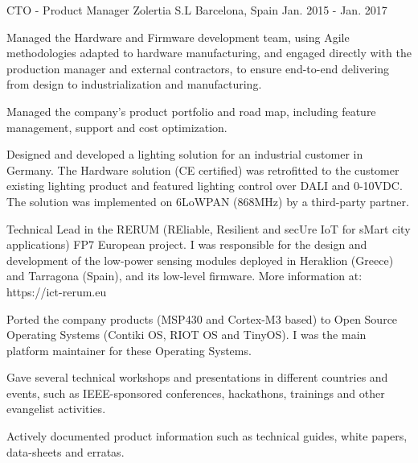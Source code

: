 \begin{cventries}

  \cventry
    {CTO - Product Manager} %
    {Zolertia S.L} %
    {Barcelona, Spain} %
    {Jan. 2015 - Jan. 2017} %
    {
      \begin{cvitems} %
        \item {Managed the Hardware and Firmware development team, using Agile methodologies adapted to hardware manufacturing, and engaged directly with the production manager and external contractors, to ensure end-to-end delivering from design to industrialization and manufacturing.}
        \item {Managed the company's product portfolio and road map, including feature management, support and cost optimization.}
        \item {Designed and developed a lighting solution for an industrial customer in Germany.  The Hardware solution (CE certified) was retrofitted to the customer existing lighting product and featured lighting control over DALI and 0-10VDC.  The solution was implemented on 6LoWPAN (868MHz) by a third-party partner.}
        \item {Technical Lead in the RERUM (REliable, Resilient and secUre IoT for sMart city applications) FP7 European project.  I was responsible for the design and development of the low-power sensing modules deployed in Heraklion (Greece) and Tarragona (Spain), and its low-level firmware.  More information at: https://ict-rerum.eu}
        \item {Ported the company products (MSP430 and Cortex-M3 based) to Open Source Operating Systems (Contiki OS, RIOT OS and TinyOS). I was the main platform maintainer for these Operating Systems.}
        \item {Gave several technical workshops and presentations in different countries and events, such as IEEE-sponsored conferences, hackathons, trainings and other evangelist activities.}
        \item {Actively documented product information such as technical guides, white papers, data-sheets and erratas.}
      \end{cvitems}
    }


\end{cventries}
